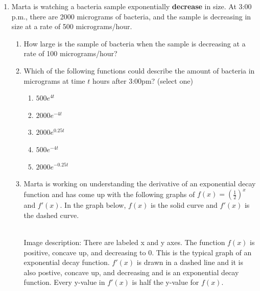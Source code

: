 \documentclass{article}
\begin{document}
\begin{enumerate}
\begin{enumerate}
    \end{enumerate}
\newpage 
\item Marta is watching a bacteria  sample exponentially \textbf{decrease} in size. At 3:00 p.m., there are 2000 micrograms of bacteria, and the sample is decreasing in size at a rate of 500 micrograms/hour. %
    \begin{enumerate}
        \item \begin{problem}[\vfill]How large is the sample of bacteria when the sample is decreasing at a rate of 100 micrograms/hour?
        \end{problem}
        \item \begin{problem}Which of the following functions could describe the amount of bacteria in micrograms at time $t$ hours after 3:00pm? (select one)
        \end{problem}
        \begin{enumerate}
            \item  $500 e^{4t}$
            \item  $2000 e^{-4t}$
            \item  $2000 e^{0.25t}$
            \item  $500 e^{-4t}$
            \item  $2000 e^{-0.25t}$
        \end{enumerate}
        \vfill
    \newpage
\item  Marta is working on understanding the derivative of an exponential decay function and has come up with the following graphs of $f(x)=\displaystyle \left(\frac12\right)^x$ and $f'(x)$. In the graph below, $f(x)$ is the solid curve and $f'(x)$ is the dashed curve. \\
    \\
   Image description: There are labeled x and y axes. The function $f(x)$ is positive, concave up, and decreasing to 0. This is the typical graph of an exponential decay function. $f'(x)$ is drawn in a dashed line and it is also postive, concave up, and decreasing and is an exponential decay function. Every y-value in $f'(x)$ is half the y-value for $f(x)$.
    

\end{enumerate}
\end{enumerate}
\end{document}

